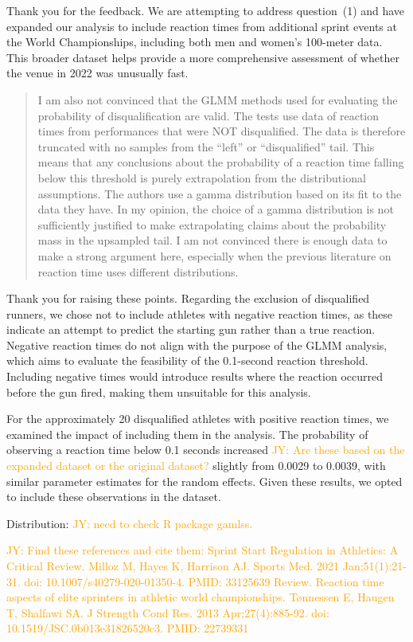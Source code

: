 \documentclass[12pt]{article}
\newcommand{\jy}[1]{\textcolor{orange}{JY: #1}}
\newenvironment{comment}%
{\begin{quotation}\noindent\small\it\color{darkblue}\ignorespaces%
}{\end{quotation}}
\begin{document}
Thank you for the feedback. We are attempting to address question~(1)
and have expanded our analysis to include reaction times from
additional sprint events at the World Championships, including both
men and women's 100-meter data. This broader dataset helps provide a
more comprehensive assessment of whether the venue in 2022 was
unusually fast. 



\begin{comment}
I am also not convinced that the GLMM methods used for evaluating the
probability of disqualification are valid. The tests use data of reaction times
from performances that were NOT disqualified.  The data is therefore truncated
with no samples from the “left” or “disqualified” tail. This means that any
conclusions about the probability of a reaction time falling below this
threshold is purely extrapolation from the distributional assumptions. The
authors use a gamma distribution based on its fit to the data they have. In my
opinion, the choice of a gamma distribution is not sufficiently justified to
make extrapolating claims about the probability mass in the upsampled tail. I am
not convinced there is enough data to make a strong argument here, especially
when the previous literature on reaction time uses different distributions.
\end{comment}

Thank you for raising these points. Regarding the exclusion of
disqualified runners, we chose not to include athletes with negative
reaction times, as these indicate an attempt to predict the starting
gun rather than a true reaction. Negative reaction times do not align
with the purpose of the GLMM analysis, which aims to evaluate the
feasibility of the 0.1-second reaction threshold. Including negative
times would introduce results where the reaction occurred before the
gun fired, making them unsuitable for this analysis.


For the approximately 20 disqualified athletes with positive reaction
times, we examined the impact of including them in the analysis. The
probability of observing a reaction time below 0.1 seconds increased
\jy{Are these based on the expanded dataset or the original dataset?}
slightly from 0.0029 to 0.0039, with similar parameter estimates for
the random effects. Given these results, we opted to include these
observations in the dataset.


Distribution: \jy{need to check R package gamlss.}


\jy{Find these references and cite them:
Sprint Start Regulation in Athletics: A Critical Review.
Milloz M, Hayes K, Harrison AJ.
Sports Med. 2021 Jan;51(1):21-31. doi: 10.1007/s40279-020-01350-4.
PMID: 33125639 Review.
Reaction time aspects of elite sprinters in athletic world championships.
Tønnessen E, Haugen T, Shalfawi SA.
J Strength Cond Res. 2013 Apr;27(4):885-92. doi: 10.1519/JSC.0b013e31826520c3.
PMID: 22739331
}
\end{document}
